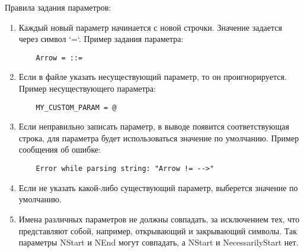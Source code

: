 \documentclass{article}
\begin{document}
Правила задания параметров:

\begin{enumerate}
  \item Каждый новый параметр начинается с новой строчки. Значение задается через символ `=`. Пример задания параметра:
  \begin{lstlisting}
    Arrow = ::=
    \end{lstlisting}
  \item Если в файле указать несуществующий параметр, то он проигнорируется. Пример несуществующего параметра:
  \begin{lstlisting}
    MY_CUSTOM_PARAM = @
    \end{lstlisting}
  \item Если неправильно записать параметр, в выводе появится соответствующая строка, для параметра будет использоваться значение по умолчанию.
Пример сообщения об ошибке:
    \begin{lstlisting}
    Error while parsing string: "Arrow != -->"
    \end{lstlisting}
\item Если не указать какой-либо существующий параметр, выберется значение по умолчанию.
\item Имена различных параметров не должны совпадать, за исключением тех, что представляют собой, например, открывающий и закрывающий символы.
Так параметры NStart и NEnd могут совпадать, а NStart и NecessarilyStart нет.
\end{enumerate}
\end{document}
